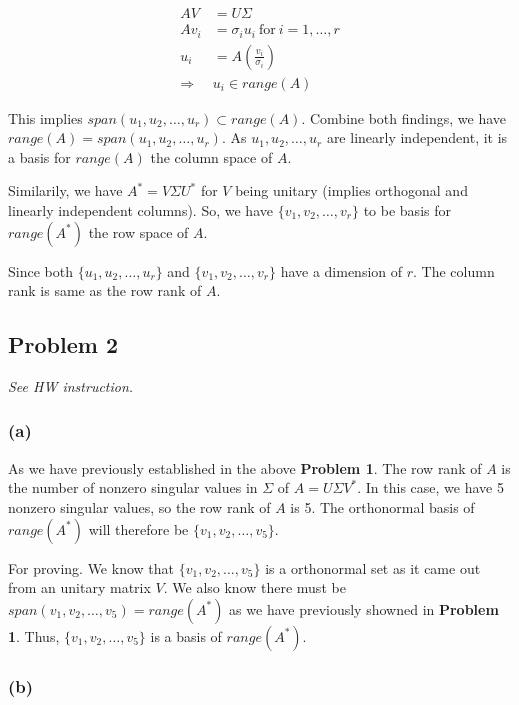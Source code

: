 \documentclass[11pt]{article}
\begin{document}
\begin{align*}
    AV &= U \Sigma \\
    A v_i &= \sigma_i u_i \ \text{for} \ i = 1, \dots, r\\
    u_i &= A(\frac{v_i}{\sigma_i}) \\
    \Longrightarrow& u_i \in range(A)
\end{align*}

This implies $span(u_1, u_2, \dots, u_r) \subset range(A)$. Combine both findings, we have $range(A) = span(u_1, u_2, \dots, u_r)$. As $u_1, u_2, \dots, u_r$ are linearly independent, it is a basis for $range(A)$ the column space of $A$.\newline

Similarily, we have $A^* = V \Sigma U^*$ for $V$ being unitary (implies orthogonal and linearly independent columns). So, we have $\{v_1, v_2, \dots, v_r\}$ to be basis for $range(A^*)$ the row space of $A$.\newline

Since both $\{u_1, u_2, \dots, u_r\}$ and $\{v_1, v_2, \dots, v_r\}$ have a dimension of $r$. The column rank is same as the row rank of $A$.



\subsection*{Problem 2}
\textit{See HW instruction.}\newline

\subsubsection*{(a)}
As we have previously established in the above \textbf{Problem 1}. The row rank of $A$ is the number of nonzero singular values in $\Sigma$ of $A = U \Sigma V^*$. In this case, we have 5 nonzero singular values, so the row rank of $A$ is 5. The orthonormal basis of $range(A^*)$ will therefore be $\{v_1, v_2, \dots, v_5 \}$.

For proving. We know that $\{v_1, v_2, \dots, v_5 \}$ is a orthonormal set as it came out from an unitary matrix $V$. We also know there must be $span(v_1, v_2, \dots, v_5) = range(A^*)$ as we have previously showned in \textbf{Problem 1}. Thus, $\{v_1, v_2, \dots, v_5 \}$ is a basis of $range(A^*)$.

\subsubsection*{(b)}
\end{document}
